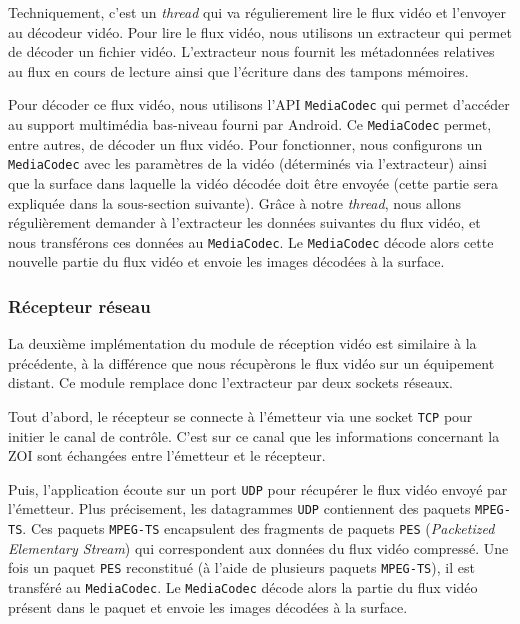 \documentclass[11pt,a4paper]{article}
\begin{document}
\bigbreak
Techniquement, c'est un \textit{thread} qui va régulierement lire le flux vidéo et l'envoyer au décodeur vidéo. 
Pour lire le flux vidéo, nous utilisons un extracteur qui permet de décoder un fichier vidéo. 
L'extracteur nous fournit les métadonnées relatives au flux en cours de lecture ainsi que l'écriture dans des tampons mémoires.

\bigbreak
Pour décoder ce flux vidéo, nous utilisons l'API \texttt{MediaCodec} qui permet d'accéder au support multimédia bas-niveau fourni par Android. Ce \texttt{MediaCodec} permet, entre autres, de décoder un flux vidéo.
Pour fonctionner, nous configurons un \texttt{MediaCodec} avec les paramètres de la vidéo (déterminés via l'extracteur) ainsi que la surface dans laquelle la vidéo décodée doit être envoyée (cette partie sera expliquée dans la sous-section suivante).
Grâce à notre \textit{thread}, nous allons régulièrement demander à l'extracteur les données suivantes du flux vidéo, et nous transférons ces données au \texttt{MediaCodec}.
Le \texttt{MediaCodec} décode alors cette nouvelle partie du flux vidéo et envoie les images décodées à la surface.

\subsubsection{Récepteur réseau}
La deuxième implémentation du module de réception vidéo est similaire à la précédente, à la différence que nous récupèrons le flux vidéo sur un équipement distant.
Ce module remplace donc l'extracteur par deux sockets réseaux.

\bigbreak
Tout d'abord, le récepteur se connecte à l'émetteur via une socket \texttt{TCP} pour initier le canal de contrôle.
C'est sur ce canal que les informations concernant la ZOI sont échangées entre l'émetteur et le récepteur.

\bigbreak
Puis, l'application écoute sur un port \texttt{UDP} pour récupérer le flux vidéo envoyé par l'émetteur.
Plus précisement, les datagrammes \texttt{UDP} contiennent des paquets \texttt{MPEG-TS}.
Ces paquets \texttt{MPEG-TS} encapsulent des fragments de paquets \texttt{PES} (\textit{Packetized Elementary Stream}) qui correspondent aux données du flux vidéo compressé.
Une fois un paquet \texttt{PES} reconstitué (à l'aide de plusieurs paquets \texttt{MPEG-TS}), il est transféré au \texttt{MediaCodec}.
Le \texttt{MediaCodec} décode alors la partie du flux vidéo présent dans le paquet et envoie les images décodées à la surface.
\end{document}
